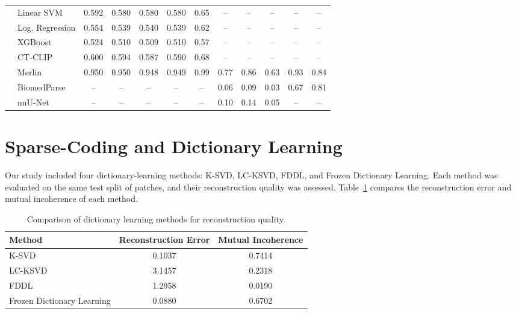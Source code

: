 \begin{table}
\begin{tabular}{llcccccccccc}
        \hline

        & Linear SVM
        & 0.592 & 0.580 & 0.580 & 0.580 & 0.65
        & -- & -- & -- & -- & -- \\

        & Log. Regression
        & 0.554 & 0.539 & 0.540 & 0.539 & 0.62
        & -- & -- & -- & -- & -- \\

        & XGBoost
        & 0.524 & 0.510 & 0.509 & 0.510 & 0.57
        & -- & -- & -- & -- & -- \\

        \hline

        & CT-CLIP
        & 0.600 & 0.594 & 0.587 & 0.590 & 0.68
        & -- & -- & -- & -- & -- \\

        & Merlin
        & 0.950 & 0.950 & 0.948 & 0.949 & 0.99
        & 0.77 & 0.86 & 0.63 & 0.93 & 0.84 \\

        & BiomedParse
        & -- & -- & -- & -- & --
        & 0.06 & 0.09 & 0.03 & 0.67 & 0.81 \\

        & nnU-Net
        & -- & -- & -- & -- & --
        & 0.10 & 0.14 & 0.05 & -- & -- \\

        \hline
    \end{tabular}
\end{table}

\section{Sparse-Coding and Dictionary Learning}

Our study included four dictionary-learning methods: K-SVD, LC-KSVD, FDDL, and Frozen Dictionary Learning.
Each method was evaluated on the same test split of patches, and their reconstruction quality was assessed.
Table~\ref{tab:dictionary_comparison} compares the reconstruction error and mutual incoherence of each method.

\begin{table}[H]
\centering
\caption{Comparison of dictionary learning methods for reconstruction quality.}
\label{tab:dictionary_comparison}
\begin{tabular}{lcc}
\hline
\textbf{Method} & \textbf{Reconstruction Error} & \textbf{Mutual Incoherence} \\
\hline
K-SVD                       & 0.1037     & 0.7414 \\
LC-KSVD                     & 3.1457     & 0.2318 \\
FDDL                        & 1.2958     & 0.0190 \\
Frozen Dictionary Learning  & 0.0880     & 0.6702 \\
\hline
\end{tabular}
\end{table}


